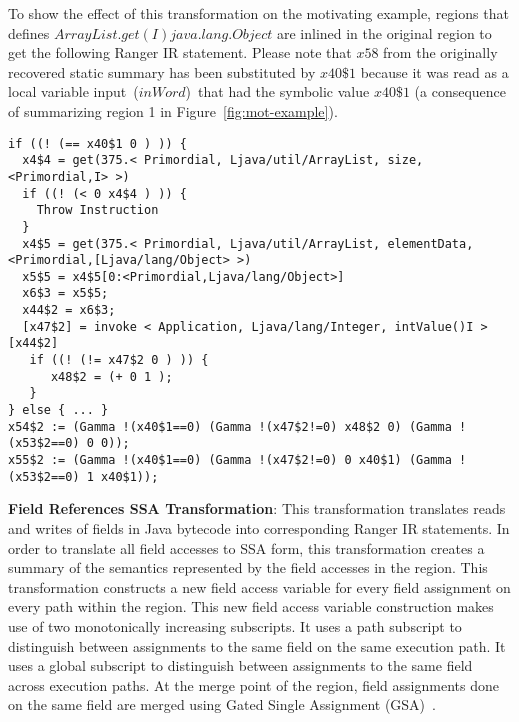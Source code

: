 %
To show the effect of this transformation on the motivating example, regions that defines
$ArrayList.get(I)java.lang.Object$ are inlined in the original region to get the following Ranger IR statement.
%
Please note that $x58$ from the originally recovered static summary has been substituted by $x40\$1$ because it was
read as a local variable input~($inWord$)~that had the symbolic value $x40\$1$ (a consequence of summarizing region 1 in
Figure~\ref{fig:mot-example}).
%
\begin{lstlisting}[numbers=none]
if ((! (== x40$1 0 ) )) {
  x4$4 = get(375.< Primordial, Ljava/util/ArrayList, size, <Primordial,I> >)
  if ((! (< 0 x4$4 ) )) {
    Throw Instruction
  }
  x4$5 = get(375.< Primordial, Ljava/util/ArrayList, elementData, <Primordial,[Ljava/lang/Object> >)
  x5$5 = x4$5[0:<Primordial,Ljava/lang/Object>]
  x6$3 = x5$5;
  x44$2 = x6$3;
  [x47$2] = invoke < Application, Ljava/lang/Integer, intValue()I >[x44$2]
   if ((! (!= x47$2 0 ) )) {
      x48$2 = (+ 0 1 );
   }
} else { ... }
x54$2 := (Gamma !(x40$1==0) (Gamma !(x47$2!=0) x48$2 0) (Gamma !(x53$2==0) 0 0));
x55$2 := (Gamma !(x40$1==0) (Gamma !(x47$2!=0) 0 x40$1) (Gamma !(x53$2==0) 1 x40$1));
\end{lstlisting}
 
\textbf{Field References SSA Transformation}: This transformation translates reads and writes of fields
in Java bytecode into corresponding Ranger IR statements.
%
In order to translate all field accesses to SSA form, this transformation creates a summary of the semantics
represented by the field accesses in the region.
%
This transformation constructs a new field access variable for every field assignment on every path within the region.
%
This new field access variable construction makes use of two monotonically increasing subscripts.
%
It uses a path subscript to distinguish between assignments to the same field on the same execution path.
%
It uses a global subscript to distinguish between assignments to the same field across execution paths.
%
At the merge point of the region, field assignments done on the same field are merged using
Gated Single Assignment (GSA)~\cite{Ottenstein1990}.
%


